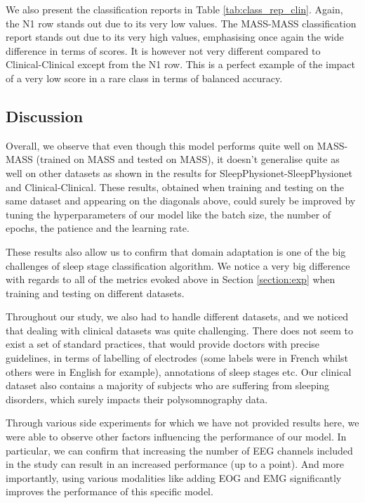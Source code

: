 \documentclass[titlepage, 11pt, a4paper, fancysections]{article}
\begin{document}
We also present the classification reports in Table \ref{tab:class_rep_clin}. Again, the N1 row stands out due to its very low values. The MASS-MASS classification report stands out due to its very high values, emphasising once again the wide difference in terms of scores. It is however not very different compared to Clinical-Clinical except from the N1 row. This is a perfect example of the impact of a very low score in a rare class in terms of balanced accuracy. 

\subsection{Discussion}
Overall, we observe that even though this model performs quite well on MASS-MASS (trained on MASS and tested on MASS), it doesn't generalise quite as well on other datasets as shown in the results for SleepPhysionet-SleepPhysionet and Clinical-Clinical. These results, obtained when training and testing on the same dataset and appearing on the diagonals above, could surely be improved by tuning the hyperparameters of our model like the batch size, the number of epochs, the patience and the learning rate. 

These results also allow us to confirm that domain adaptation is one of the big challenges of sleep stage classification algorithm. We notice a very big difference with regards to all of the metrics evoked above in Section \ref{section:exp} when training and testing on different datasets. 

Throughout our study, we also had to handle different datasets, and we noticed that dealing with clinical datasets was quite challenging. There does not seem to exist a set of standard practices, that would provide doctors with precise guidelines, in terms of labelling of electrodes (some labels were in French whilst others were in English for example), annotations of sleep stages etc. Our clinical dataset also contains a majority of subjects who are suffering from sleeping disorders, which surely impacts their polysomnography data.

Through various side experiments for which we have not provided results here, we were able to observe other factors influencing the performance of our model. In particular, we can confirm that increasing the number of EEG channels included in the study can result in an increased performance (up to a point). And more importantly, using various modalities like adding EOG and EMG significantly improves the performance of this specific model. 
\end{document}
